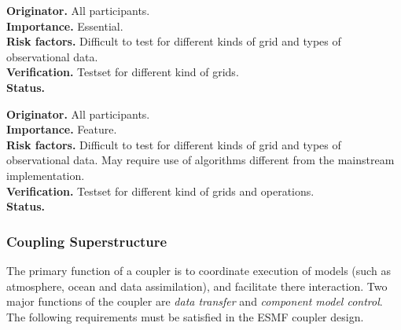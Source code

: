 \begin{reqlist}
{\bf Originator.} All participants. \\
{\bf Importance.} Essential. \\
{\bf Risk factors.} Difficult to test for different kinds of grid and types 
of observational data. \\
{\bf Verification.} Testset for different kind of grids. \\
{\bf Status.} 
\end{reqlist}







\begin{reqlist}
{\bf Originator.} All participants. \\
{\bf Importance.} Feature. \\
{\bf Risk factors.} Difficult to test for different kinds of grid and types 
of observational data. May require use of algorithms different from the mainstream implementation. \\
{\bf Verification.} Testset for different kind of grids and operations. \\
{\bf Status.} 
\end{reqlist}


\subsubsection{Coupling Superstructure}

The primary function of a coupler is to coordinate execution of models 
(such as atmosphere, ocean and data assimilation), and facilitate there 
interaction. Two major functions of the coupler are {\it data transfer}
and {\it component model control}. The following requirements must be 
satisfied in the ESMF coupler design.

